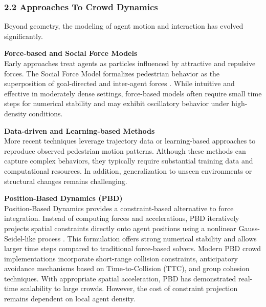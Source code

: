 

\subsubsection{2.2 Approaches To Crowd Dynamics}
Beyond geometry, the modeling of agent motion and interaction has evolved significantly.

\vspace{0.5em}
\textbf{Force-based and Social Force Models}\\
Early approaches treat agents as particles influenced by attractive and repulsive forces. The Social Force Model formalizes pedestrian behavior as the superposition of goal-directed and inter-agent forces \cite{Helbing1995}. While intuitive and effective in moderately dense settings, force-based models often require small time steps for numerical stability and may exhibit oscillatory behavior under high-density conditions.

\vspace{0.5em}
\textbf{Data-driven and Learning-based Methods}\\
More recent techniques leverage trajectory data or learning-based approaches to reproduce observed pedestrian motion patterns. Although these methods can capture complex behaviors, they typically require substantial training data and computational resources. In addition, generalization to unseen environments or structural changes remains challenging.

\vspace{0.5em}
\textbf{Position-Based Dynamics (PBD)}\\
Position-Based Dynamics provides a constraint-based alternative to force integration. Instead of computing forces and accelerations, PBD iteratively projects spatial constraints directly onto agent positions using a nonlinear Gauss-Seidel-like process \cite{WEISS201912, WeissImp2019}. This formulation offers strong numerical stability and allows larger time steps compared to traditional force-based solvers. Modern PBD crowd implementations incorporate short-range collision constraints, anticipatory avoidance mechanisms based on Time-to-Collision (TTC), and group cohesion techniques. With appropriate spatial acceleration, PBD has demonstrated real-time scalability to large crowds. However, the cost of constraint projection remains dependent on local agent density.

